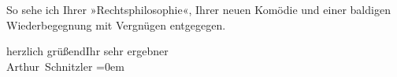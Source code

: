 \pstart
           So sehe ich Ihrer »Rechtsphilosophie«, Ihrer
               neuen Komödie und einer baldigen Wiederbegegnung mit Vergnügen entgegegen.\pend
           
\pstart
           herzlich grüßend\hspace*{1.5em}Ihr sehr ergebner{\\[\baselineskip]}\spacefill\mbox{Arthur Schnitzler}\pend
           \leftskip=0em{}\endnumbering{}  
      